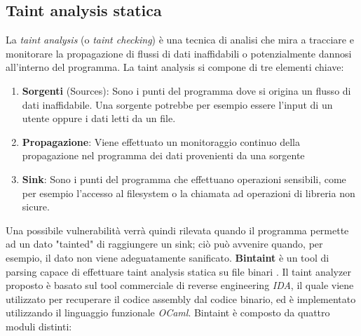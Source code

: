 \documentclass[../main.tex]{subfiles}
\begin{document}
\subsection{Taint analysis statica}
La \textit{taint analysis} (o \textit{taint checking}) è una tecnica di analisi che mira a tracciare e monitorare la propagazione di flussi di dati inaffidabili o 
potenzialmente dannosi all'interno del programma. La taint analysis si compone di tre elementi chiave:
\begin{enumerate}
    \item \textbf{Sorgenti} (Sources): Sono i punti del programma dove si origina un flusso di dati inaffidabile. Una sorgente potrebbe per esempio essere l'input di un utente oppure i dati
    letti da un file.
    \item \textbf{Propagazione}: Viene effettuato un monitoraggio continuo della propagazione nel programma dei dati provenienti da una sorgente
    \item \textbf{Sink}: Sono i punti del programma che effettuano operazioni sensibili, come per esempio l'accesso al filesystem o la chiamata ad operazioni di libreria non sicure. 
\end{enumerate}
Una possibile vulnerabilità verrà quindi rilevata quando il programma permette ad un dato "tainted" di raggiungere un sink; ciò può avvenire quando, per esempio, il dato
non viene adeguatamente sanificato.
\newline
\textbf{Bintaint} è un tool di parsing capace di effettuare taint analysis statica su file binari  \cite{Bintaint}.
Il taint analyzer proposto è basato sul tool commerciale di reverse engineering \textit{IDA}, il quale viene utilizzato per recuperare il codice assembly dal codice binario, 
ed è implementato utilizzando il linguaggio funzionale \textit{OCaml}.
Bintaint è composto da quattro moduli distinti:
\end{document}
